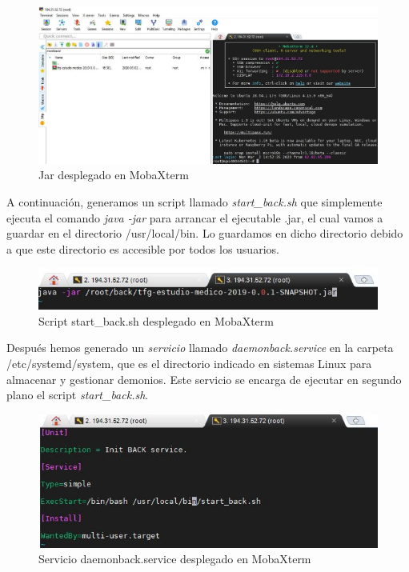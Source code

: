     \begin{figure}[h]
    \centering
     \includegraphics[width=1\textwidth]{images/jarback2.jpg}
    \caption{Jar desplegado en MobaXterm}
    \end{figure}
    
     \FloatBarrier
    
    A continuación, generamos un script llamado \textit{start\_back.sh}  que simplemente ejecuta el comando \textit{java -jar} para arrancar el ejecutable .jar, el cual vamos a guardar en el directorio /usr/local/bin. Lo guardamos en dicho directorio debido a que este directorio es accesible por todos los usuarios.
    
    \begin{figure}[h]
    \centering
     \includegraphics[width=1\textwidth]{images/script}
    \caption{Script start\_back.sh desplegado en MobaXterm}
    \end{figure}
    
     \FloatBarrier
    
    Después hemos generado un \textit{servicio} llamado \textit{daemonback.service} en la carpeta /etc/systemd/system, que es el directorio indicado en sistemas Linux para almacenar y gestionar demonios. Este servicio se encarga de ejecutar en segundo plano el script \textit{start\_back.sh}. 
    
    \begin{figure}[h]
    \centering
     \includegraphics[width=1\textwidth]{images/demonio}
    \caption{Servicio daemonback.service desplegado en MobaXterm}
    \end{figure}
    
